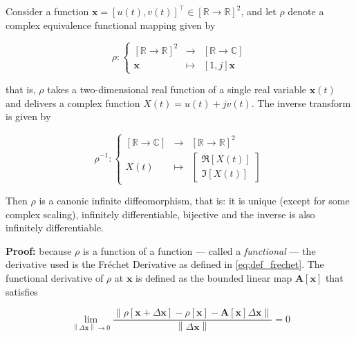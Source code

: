 \begin{theorem}\label{theo:rho_diff_inf} %
	Consider a function $\mathbf{x} = \left[u(t),v(t)\right]^\intercal\in\left[\mathbb{R}\to\mathbb{R}\right]^2$, and let $\rho$ denote a complex equivalence functional mapping given by

\begin{equation} \rho: \left\{\begin{array}{rcl} \left[\mathbb{R}\to\mathbb{R}\right]^2 &\to& \left[\mathbb{R}\to\mathbb{C}\right] \\[3mm] \mathbf{x} &\mapsto& \left[1,j\right]\mathbf{x} \end{array}\right. \end{equation}

	\noindent that is, $\rho$ takes a two-dimensional real function of a single real variable $\mathbf{x}(t)$ and delivers a complex function $X(t) = u(t) + jv(t)$. The inverse transform is given by

\begin{equation} \rho^{-1}: \left\{\begin{array}{rcl} \left[\mathbb{R}\to\mathbb{C}\right] &\to& \left[\mathbb{R}\to\mathbb{R}\right]^2 \\[3mm] X(t) &\mapsto& \left[\begin{array}{c} \Re\left[X\left(t\right)\right]\\[3mm] \Im\left[X\left(t\right)\right]\end{array}\right] \end{array}\right. \end{equation}

	Then $\rho$ is a canonic infinite diffeomorphism, that is: it is unique (except for some complex scaling), infinitely differentiable, bijective and the inverse is also infinitely differentiable. 
\end{theorem}

\textbf{Proof:} because $\rho$ is a function of a function — called a \textit{functional} — the derivative used is the Fréchet Derivative as defined in \eqref{eq:def_frechet}. The functional derivative of $\rho$ at $\mathbf{x}$ is defined as the bounded linear map $\mathbf{A}\left[\mathbf{x}\right]$ that satisfies

\begin{equation} \lim\limits_{\left\lVert \Delta\mathbf{x}\right\rVert\to 0} \dfrac{\left\lVert \rho\left[\mathbf{x} + \Delta\mathbf{x}\right] - \rho\left[\mathbf{x}\right] - \mathbf{A}\left[\mathbf{x}\right]\Delta\mathbf{x}\right\rVert}{\left\lVert \Delta\mathbf{x}\right\rVert} = 0\end{equation}

